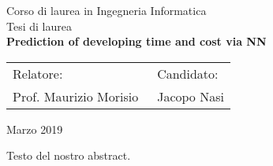 \documentclass[12pt]{rapporto}
\begin{document}
        \pagestyle{empty}
        \begin{center}

                Corso di laurea in Ingegneria Informatica\\
                \vspace{1cm}
                {\large Tesi di laurea}\\
                \vspace{1cm}
                {\Large \textbf{Prediction of developing time and cost via NN}}\\
        \end{center}
        \vspace{1cm}
        \begin{tabular}{l l}
                Relatore:  &  Candidato: \\
                Prof. Maurizio Morisio \hspace{6 cm}$\,$ & Jacopo Nasi \\
        \end{tabular}
        \vspace{1cm}
        \begin{center}
               Marzo 2019 \\ %
        \end{center}
        \vspace{1cm}

Testo del nostro abstract.
\end{document}
